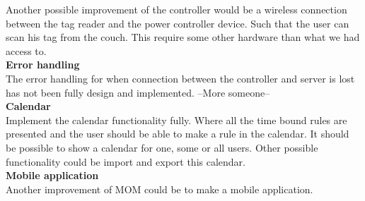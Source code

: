 Another possible improvement of the controller would be a wireless connection between the tag reader and the power controller device. Such that the user can scan his tag from the couch. This require some other hardware than what we had access to.\\

\textbf{Error handling}\\
The error handling for when connection between the controller and server is lost has not been fully design and implemented.  --More someone--\\

\textbf{Calendar}\\
Implement the calendar functionality fully. Where all the time bound rules are presented and the user should be able to make a rule in the calendar. It should be possible to show a calendar for one, some or all users. Other possible functionality could be import and export this calendar.\\

\textbf{Mobile application}\\
Another improvement of MOM could be to make a mobile application.\\





  


